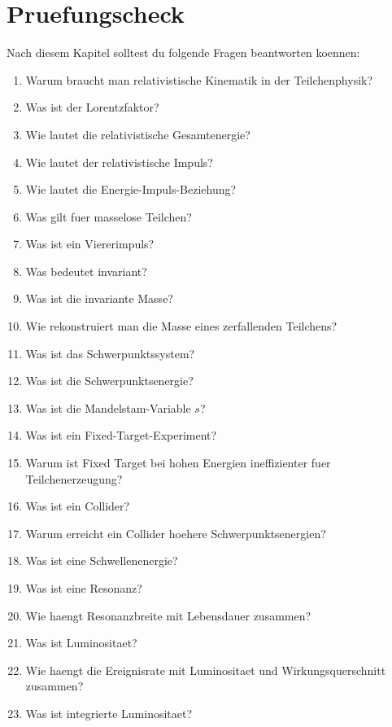 \section{Pruefungscheck}

\begin{examtipbox}
Nach diesem Kapitel solltest du folgende Fragen beantworten koennen:
\begin{enumerate}
    \item Warum braucht man relativistische Kinematik in der Teilchenphysik?
    \item Was ist der Lorentzfaktor?
    \item Wie lautet die relativistische Gesamtenergie?
    \item Wie lautet der relativistische Impuls?
    \item Wie lautet die Energie-Impuls-Beziehung?
    \item Was gilt fuer masselose Teilchen?
    \item Was ist ein Viererimpuls?
    \item Was bedeutet invariant?
    \item Was ist die invariante Masse?
    \item Wie rekonstruiert man die Masse eines zerfallenden Teilchens?
    \item Was ist das Schwerpunktssystem?
    \item Was ist die Schwerpunktsenergie?
    \item Was ist die Mandelstam-Variable $s$?
    \item Was ist ein Fixed-Target-Experiment?
    \item Warum ist Fixed Target bei hohen Energien ineffizienter fuer Teilchenerzeugung?
    \item Was ist ein Collider?
    \item Warum erreicht ein Collider hoehere Schwerpunktsenergien?
    \item Was ist eine Schwellenenergie?
    \item Was ist eine Resonanz?
    \item Wie haengt Resonanzbreite mit Lebensdauer zusammen?
    \item Was ist Luminositaet?
    \item Wie haengt die Ereignisrate mit Luminositaet und Wirkungsquerschnitt zusammen?
    \item Was ist integrierte Luminositaet?
\end{enumerate}
\end{examtipbox}